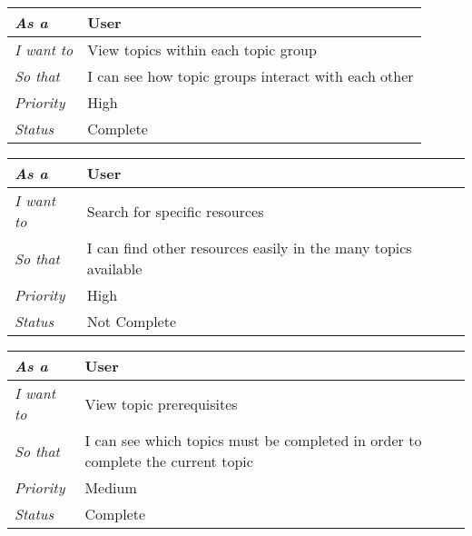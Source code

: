 \begin{table}[h!]
\begin{tabular}{|l|l|}
\hline
\textit{As a}      & User                                                \\ \hline
\textit{I want to} & View topics within each topic group                 \\ \hline
\textit{So that}   & I can see how topic groups interact with each other \\ \hline
\textit{Priority}  & {\color[HTML]{FE0000} High}                         \\ \hline
\textit{Status}    & Complete                                            \\ \hline
\end{tabular}
\end{table}

\begin{table}[h!]
\begin{tabular}{|l|l|}
\hline
\textit{As a}      & User                                                           \\ \hline
\textit{I want to} & Search for specific resources                                  \\ \hline
\textit{So that}   & I can find other resources easily in the many topics available \\ \hline
\textit{Priority}  & {\color[HTML]{FE0000} High}                                    \\ \hline
\textit{Status}    & Not Complete                                                   \\ \hline          
\end{tabular}
\end{table}

\begin{table}[h!]
\begin{tabular}{|l|l|}
\hline
\textit{As a}      & User                                                                            \\ \hline
\textit{I want to} & View topic prerequisites                                                        \\ \hline
\textit{So that}   & I can see which topics must be completed in order to complete the current topic \\ \hline
\textit{Priority}  & {\color[HTML]{FE996B} Medium}                                                     \\ \hline
\textit{Status}    & Complete                                                                        \\ \hline                              
\end{tabular}
\end{table}

